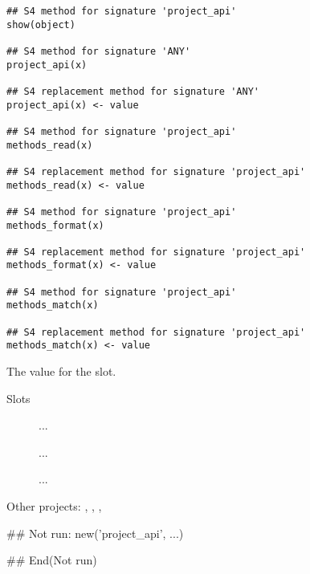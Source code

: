 \documentclass[letterpaper]{book}
\begin{document}
%
\begin{Usage}
\begin{verbatim}
## S4 method for signature 'project_api'
show(object)

## S4 method for signature 'ANY'
project_api(x)

## S4 replacement method for signature 'ANY'
project_api(x) <- value

## S4 method for signature 'project_api'
methods_read(x)

## S4 replacement method for signature 'project_api'
methods_read(x) <- value

## S4 method for signature 'project_api'
methods_format(x)

## S4 replacement method for signature 'project_api'
methods_format(x) <- value

## S4 method for signature 'project_api'
methods_match(x)

## S4 replacement method for signature 'project_api'
methods_match(x) <- value
\end{verbatim}
\end{Usage}
%
\begin{Arguments}
\begin{ldescription}
\item[\code{value}] The value for the slot.
\end{ldescription}
\end{Arguments}
%
\begin{Section}{Slots}

\begin{description}

\item[] ...

\item[] ...

\item[] ...

\end{description}
\end{Section}
%
\begin{SeeAlso}\relax
Other projects: 
,
,
,
\end{SeeAlso}
%
\begin{Examples}
\begin{ExampleCode}
## Not run: 
new('project_api', ...)

## End(Not run)
\end{ExampleCode}
\end{Examples}
\end{document}
